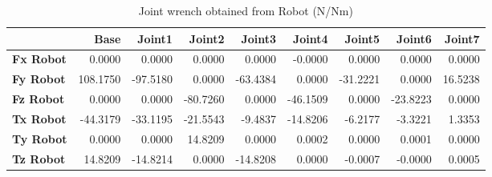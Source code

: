 \begin{table}[h!]
	\centering
	\caption{Joint wrench obtained from Robot (N/Nm)}
	\label{wrech_Robot_Pose14}
	\begin{tabular}{|l|r|r|r|r|r|r|r|r|}
		\hline
		\textbf{} & \textbf{Base} & \textbf{Joint1}  & \textbf{Joint2}  & \textbf{Joint3}  & \textbf{Joint4}  & \textbf{Joint5}  & \textbf{Joint6}  & \textbf{Joint7} \\ \hline
		\textbf{Fx Robot}  & 0.0000        & 0.0000        & 0.0000        & 0.0000        & -0.0000        & 0.0000        & 0.0000        & 0.0000 \\ \hline
		\textbf{Fy Robot}  & 108.1750        & -97.5180        & 0.0000        & -63.4384        & 0.0000        & -31.2221        & 0.0000        & 16.5238 \\ \hline
		\textbf{Fz Robot}  & 0.0000        & 0.0000        & -80.7260        & 0.0000        & -46.1509        & 0.0000        & -23.8223        & 0.0000 \\ \hline
		\textbf{Tx Robot}  & -44.3179        & -33.1195        & -21.5543        & -9.4837        & -14.8206        & -6.2177        & -3.3221        & 1.3353 \\ \hline
		\textbf{Ty Robot}  & 0.0000        & 0.0000        & 14.8209        & 0.0000        & 0.0002        & 0.0000        & 0.0001        & 0.0000 \\ \hline
		\textbf{Tz Robot}  & 14.8209        & -14.8214        & 0.0000        & -14.8208        & 0.0000        & -0.0007        & -0.0000        & 0.0005 \\ \hline
	\end{tabular}
\end{table}

